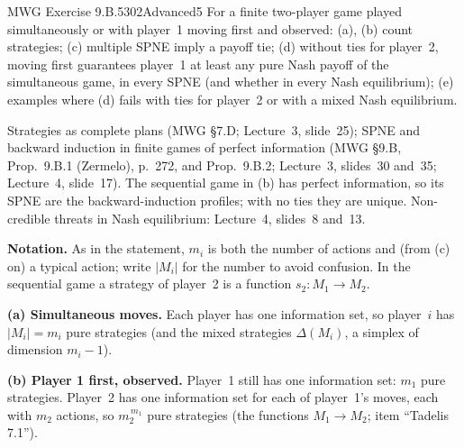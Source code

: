 \begin{exsol}{MWG Exercise 9.B.5}{302}{Advanced}{5}
\asked For a finite two-player game played simultaneously or with player~1 moving first and
observed: (a), (b) count strategies; (c) multiple SPNE imply a payoff tie; (d) without ties for
player~2, moving first guarantees player~1 at least any pure Nash payoff of the simultaneous game,
in every SPNE (and whether in every Nash equilibrium); (e) examples where (d) fails with ties for
player~2 or with a mixed Nash equilibrium.

\method Strategies as complete plans (MWG \S7.D; Lecture~3, slide~25); SPNE and backward induction in
finite games of perfect information (MWG \S9.B, Prop.~9.B.1 (Zermelo), p.~272, and Prop.~9.B.2;
Lecture~3, slides~30 and~35; Lecture~4, slide~17). The sequential game in (b) has perfect information,
so its SPNE are the backward-induction profiles; with no ties they are unique. Non-credible threats in
Nash equilibrium: Lecture~4, slides~8 and~13.

\solution
\textbf{Notation.} As in the statement, $m_i$ is both the number of actions and (from (c) on) a typical
action; write $|M_i|$ for the number to avoid confusion. In the sequential game a strategy of
player~2 is a function $s_2: M_1 \to M_2$.

\textbf{(a) Simultaneous moves.} Each player has one information set, so player~$i$ has $|M_i| = m_i$
pure strategies (and the mixed strategies $\Delta(M_i)$, a simplex of dimension $m_i - 1$).

\textbf{(b) Player 1 first, observed.} Player~1 still has one information set: $m_1$ pure strategies.
Player~2 has one information set for each of player~1's moves, each with $m_2$ actions, so
$m_2^{\,m_1}$ pure strategies (the functions $M_1 \to M_2$; item ``Tadelis 7.1'').


\end{exsol}

